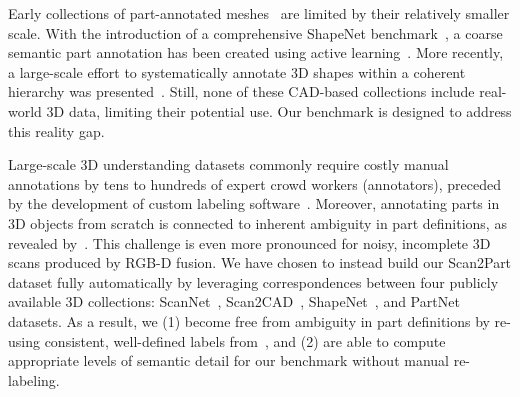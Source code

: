 


Early collections of part-annotated meshes~\cite{Chen:2009:ABF} are limited by their relatively smaller scale.
With the introduction of a comprehensive ShapeNet benchmark~\cite{chang2015shapenet}, a coarse semantic part annotation has been created using active learning~\cite{yi2016scalable}. 
More recently, a large-scale effort to systematically annotate 3D shapes within a coherent hierarchy was presented~\cite{mo2019partnet}.
Still, none of these CAD-based collections include real-world 3D data, limiting their potential use. Our benchmark is designed to address this reality gap.

Large-scale 3D understanding datasets commonly require costly manual annotations by tens to hundreds of expert crowd workers (annotators), preceded by the development of custom labeling software~\cite{armeni20163d,hua2016scenenn,dai2017scannet,chang2017matterport3d,2017arXiv170201105A,replica19arxiv,yi2016scalable,mo2019partnet}.
Moreover, annotating parts in 3D objects from scratch is connected to inherent ambiguity in part definitions, as revealed by~\cite{yi2016scalable,mo2019partnet}. This challenge is even more pronounced for noisy, incomplete 3D scans produced by RGB-D fusion.
We have chosen to instead build our Scan2Part dataset fully automatically by leveraging correspondences between four publicly available 3D collections: ScanNet~\cite{dai2017scannet}, Scan2CAD~\cite{avetisyan2019scan2cad}, ShapeNet~\cite{chang2015shapenet}, and PartNet~\cite{mo2019partnet} datasets.
As a result, we (1) become free from ambiguity in part definitions by re-using consistent, well-defined labels from~\cite{mo2019partnet}, and (2) are able to compute appropriate levels of semantic detail for our benchmark without manual re-labeling.

